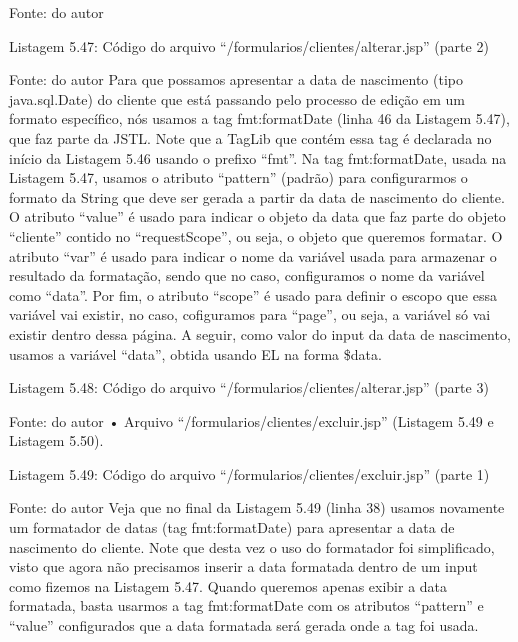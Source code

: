 Fonte: do autor







Listagem 5.47: Código do arquivo “/formularios/clientes/alterar.jsp” (parte 2)
 
Fonte: do autor
Para que possamos apresentar a data de nascimento (tipo java.sql.Date) do cliente que está passando pelo processo de edição em um formato específico, nós usamos a tag fmt:formatDate (linha 46 da Listagem 5.47), que faz parte da JSTL. Note que a TagLib que contém essa tag é declarada no início da Listagem 5.46 usando o prefixo “fmt”. Na tag fmt:formatDate, usada na Listagem 5.47, usamos o atributo “pattern” (padrão) para configurarmos o formato da String que deve ser gerada a partir da data de nascimento do cliente. O atributo “value” é usado para indicar o objeto da data que faz parte do objeto “cliente” contido no “requestScope”, ou seja, o objeto que queremos formatar. O atributo “var” é usado para indicar o nome da variável usada para armazenar o resultado da formatação, sendo que no caso, configuramos o nome da variável como “data”. Por fim, o atributo “scope” é usado para definir o escopo que essa variável vai existir, no caso, cofiguramos para “page”, ou seja, a variável só vai existir dentro dessa página. A seguir, como valor do input da data de nascimento, usamos a variável “data”, obtida usando EL na forma \${data}.





















Listagem 5.48: Código do arquivo “/formularios/clientes/alterar.jsp” (parte 3)
 
Fonte: do autor
•	Arquivo “/formularios/clientes/excluir.jsp” (Listagem 5.49 e Listagem 5.50).

Listagem 5.49: Código do arquivo “/formularios/clientes/excluir.jsp” (parte 1)
 
Fonte: do autor
Veja que no final da Listagem 5.49 (linha 38) usamos novamente um formatador de datas (tag fmt:formatDate) para apresentar a data de nascimento do cliente. Note que desta vez o uso do formatador foi simplificado, visto que agora não precisamos inserir a data formatada dentro de um input como fizemos na Listagem 5.47. Quando queremos apenas exibir a data formatada, basta usarmos a tag fmt:formatDate com os atributos “pattern” e “value” configurados que a data formatada será gerada onde a tag foi usada.



